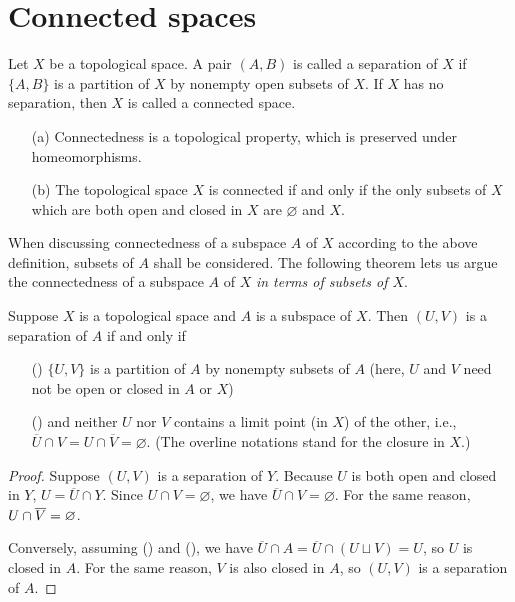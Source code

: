 \section{Connected spaces}

\begin{defi}
    Let $X$ be a topological space.
    A pair $(A, B)$ is called a separation of $X$ if $\{A, B\}$ is a partition of $X$ by nonempty open subsets of $X$.
    If $X$ has no separation, then $X$ is called a connected space.
\end{defi}
\begin{rmk}
    \begin{enumerate}
        \item[(a)]
        {
            Connectedness is a topological property, which is preserved under homeomorphisms.
        }
        \item[(b)]
        {
            The topological space $X$ is connected if and only if the only subsets of $X$ which are both open and closed in $X$ are $\varnothing$ and $X$.
        }
    \end{enumerate}
\end{rmk}

When discussing connectedness of a subspace $A$ of $X$ according to the above definition, subsets of $A$ shall be considered.
The following theorem lets us argue the connectedness of a subspace $A$ of $X$ \textit{in terms of subsets of $X$}.
\begin{thm}
    Suppose $X$ is a topological space and $A$ is a subspace of $X$.
    Then $(U, V)$ is a separation of $A$ if and only if
    \begin{enumerate}
        \item[(\romannumeral 1)]
        {
            $\{U, V\}$ is a partition of $A$ by nonempty subsets of $A$ (here, $U$ and $V$ need not be open or closed in $A$ or $X$)
        }
        \item[(\romannumeral 2)]
        {
            and neither $U$ nor $V$ contains a limit point (in $X$) of the other, i.e., $\overline{U}\cap V=U\cap\overline{V}=\varnothing$. (The overline notations stand for the closure in $X$.)
        }
    \end{enumerate}
\end{thm}
\begin{proof}
    Suppose $(U, V)$ is a separation of $Y$.
    Because $U$ is both open and closed in $Y$, $U=\overline{U}\cap Y$.
    Since $U\cap V=\varnothing$, we have $\overline{U}\cap V=\varnothing$.
    For the same reason, $U\cap\overline{V}=\varnothing$.

    Conversely, assuming () and (), we have $\overline{U}\cap A=\overline{U}\cap(U\sqcup V)=U$, so $U$ is closed in $A$.
    For the same reason, $V$ is also closed in $A$, so $(U, V)$ is a separation of $A$.
\end{proof}


